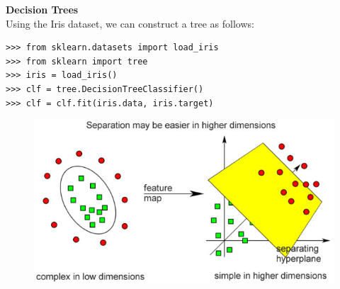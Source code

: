 \documentclass[MASTER.tex]{subfiles}
\begin{document}
\begin{frame}[fragile]
	\LARGE
\textbf{Decision Trees}\\

Using the Iris dataset, we can construct a tree as follows:
{
\normalsize
\begin{framed}
\begin{verbatim}
>>> from sklearn.datasets import load_iris
>>> from sklearn import tree
>>> iris = load_iris()
>>> clf = tree.DecisionTreeClassifier()
>>> clf = clf.fit(iris.data, iris.target)
\end{verbatim}
\end{framed}
}
\end{frame}

\begin{frame}

\begin{figure}
\centering
\includegraphics[width=1.1\linewidth]{SVMexplain}
\end{figure}
	
\end{frame}
\end{document}
